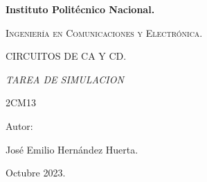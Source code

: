 \documentclass[10pt]{article}
\begin{document}
\pagestyle{fancy}
\cfoot{}


\lhead{}

\begin{titlepage}

	\begin{figure}[t]
		\hspace{0.6\textwidth}
	\end{figure}

	\centering
	{\bfseries\Huge Instituto Politécnico Nacional. \par}
	\vspace{1cm}
	{\scshape\Large Ingeniería en Comunicaciones y Electrónica. \par}
	\vspace{0.3cm}
	{\scshape\Large CIRCUITOS DE CA Y CD.  \par}
	\vspace{1cm}
	{\scshape\Huge  \par}
	\vspace{1cm}
	{\itshape\Large TAREA DE SIMULACION \par}
	{\Large 2CM13\par}
	\vfill
	{\Large Autor: \par}
	{\Large José Emilio Hernández Huerta. \par}
	\vfill
	{\Large Octubre 2023. \par}

\end{titlepage}

\newpage
\end{document}

